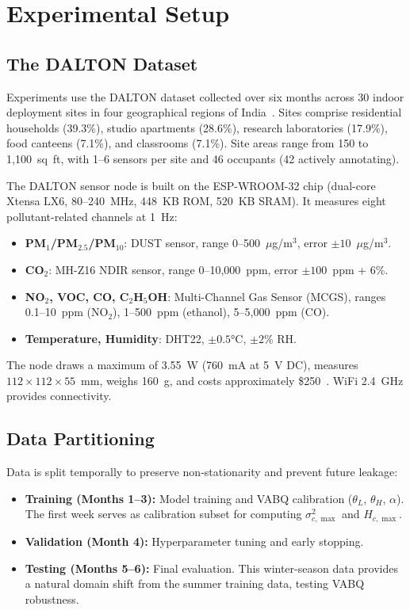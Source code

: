 \section{Experimental Setup}
\label{sec:experiments}

\subsection{The DALTON Dataset}
\label{sec:exp_dataset}

Experiments use the DALTON dataset collected over six months across 30 indoor deployment sites in four geographical regions of India~\cite{karmakar2024exploring, karmakar2024indoor}. Sites comprise residential households (39.3\%), studio apartments (28.6\%), research laboratories (17.9\%), food canteens (7.1\%), and classrooms (7.1\%). Site areas range from 150 to 1,100~sq~ft, with 1--6 sensors per site and 46 occupants (42 actively annotating).

The DALTON sensor node is built on the ESP-WROOM-32 chip (dual-core Xtensa LX6, 80--240~MHz, 448~KB ROM, 520~KB SRAM). It measures eight pollutant-related channels at 1~Hz:
\begin{itemize}[leftmargin=*]
    \item \textbf{PM$_1$/PM$_{2.5}$/PM$_{10}$}: DUST sensor, range 0--500~$\mu$g/m$^3$, error $\pm 10$~$\mu$g/m$^3$.
    \item \textbf{CO$_2$}: MH-Z16 NDIR sensor, range 0--10,000~ppm, error $\pm 100$~ppm + 6\%.
    \item \textbf{NO$_2$, VOC, CO, C$_2$H$_5$OH}: Multi-Channel Gas Sensor (MCGS), ranges 0.1--10~ppm (NO$_2$), 1--500~ppm (ethanol), 5--5,000~ppm (CO).
    \item \textbf{Temperature, Humidity}: DHT22, $\pm 0.5$°C, $\pm 2$\% RH.
\end{itemize}
The node draws a maximum of 3.55~W (760~mA at 5~V DC), measures $112 \times 112 \times 55$~mm, weighs 160~g, and costs approximately \$250~\cite{karmakar2024exploring}. WiFi 2.4~GHz provides connectivity.

\subsection{Data Partitioning}
\label{sec:exp_partition}

Data is split temporally to preserve non-stationarity and prevent future leakage:
\begin{itemize}[leftmargin=*]
    \item \textbf{Training (Months 1--3):} Model training and VABQ calibration ($\theta_L$, $\theta_H$, $\alpha$). The first week serves as calibration subset for computing $\sigma_{c,\max}^2$ and $H_{c,\max}$.
    \item \textbf{Validation (Month 4):} Hyperparameter tuning and early stopping.
    \item \textbf{Testing (Months 5--6):} Final evaluation. This winter-season data provides a natural domain shift from the summer training data, testing VABQ robustness.
\end{itemize}

